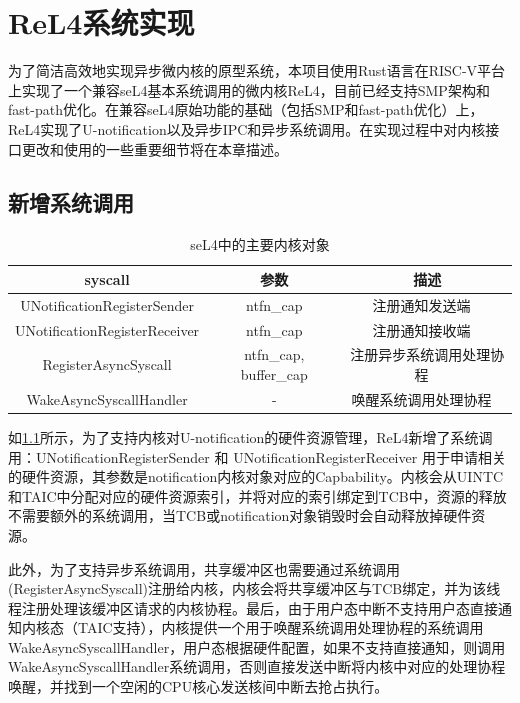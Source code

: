 \chapter{ReL4系统实现}
\label{chap:ReL4_impl}

为了简洁高效地实现异步微内核的原型系统，本项目使用Rust语言在RISC-V平台上实现了一个兼容seL4基本系统调用的微内核ReL4，目前已经支持SMP架构和fast-path优化。在兼容seL4原始功能的基础（包括SMP和fast-path优化）上， ReL4实现了U-notification以及异步IPC和异步系统调用。在实现过程中对内核接口更改和使用的一些重要细节将在本章描述。

\section{新增系统调用}

\begin{table}
    \centering
    \caption{seL4中的主要内核对象} 
    \begin{tabular}{|c|c|c|}
        \hline 
        syscall & 参数 & 描述 \\
        \hline
        UNotificationRegisterSender & ntfn\_cap & 注册通知发送端 \ \\
        \hline
        UNotificationRegisterReceiver & ntfn\_cap & 注册通知接收端 \ \\
        \hline
        RegisterAsyncSyscall & ntfn\_cap, buffer\_cap & 注册异步系统调用处理协程 \ \\
        \hline
        WakeAsyncSyscallHandler & - & 唤醒系统调用处理协程 \ \\
        \hline
    \end{tabular}
    \label{tab:new_syscall}
\end{table}

如\ref{tab:new_syscall}所示，为了支持内核对U-notification的硬件资源管理，ReL4新增了系统调用：UNotificationRegisterSender 和 UNotificationRegisterReceiver 用于申请相关的硬件资源，其参数是notification内核对象对应的Capbability。内核会从UINTC和TAIC中分配对应的硬件资源索引，并将对应的索引绑定到TCB中，资源的释放不需要额外的系统调用，当TCB或notification对象销毁时会自动释放掉硬件资源。

此外，为了支持异步系统调用，共享缓冲区也需要通过系统调用(RegisterAsyncSyscall)注册给内核，内核会将共享缓冲区与TCB绑定，并为该线程注册处理该缓冲区请求的内核协程。最后，由于用户态中断不支持用户态直接通知内核态（TAIC支持），内核提供一个用于唤醒系统调用处理协程的系统调用WakeAsyncSyscallHandler，用户态根据硬件配置，如果不支持直接通知，则调用WakeAsyncSyscallHandler系统调用，否则直接发送中断将内核中对应的处理协程唤醒，并找到一个空闲的CPU核心发送核间中断去抢占执行。


